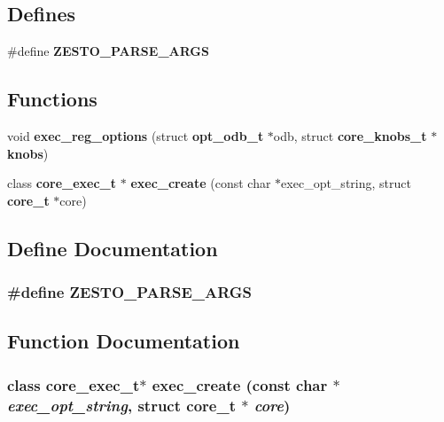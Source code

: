 \subsection*{Defines}
\begin{CompactItemize}
\item 
\#define {\bf ZESTO\_\-PARSE\_\-ARGS}
\end{CompactItemize}
\subsection*{Functions}
\begin{CompactItemize}
\item 
void {\bf exec\_\-reg\_\-options} (struct {\bf opt\_\-odb\_\-t} $\ast$odb, struct {\bf core\_\-knobs\_\-t} $\ast${\bf knobs})
\item 
class {\bf core\_\-exec\_\-t} $\ast$ {\bf exec\_\-create} (const char $\ast$exec\_\-opt\_\-string, struct {\bf core\_\-t} $\ast$core)
\end{CompactItemize}


\subsection{Define Documentation}
\subsubsection[{ZESTO\_\-PARSE\_\-ARGS}]{\setlength{\rightskip}{0pt plus 5cm}\#define ZESTO\_\-PARSE\_\-ARGS}\label{zesto-exec_8cpp_ecd9ec00b3dd5733f280e06811f8bbfc}




\subsection{Function Documentation}
\subsubsection[{exec\_\-create}]{\setlength{\rightskip}{0pt plus 5cm}class {\bf core\_\-exec\_\-t}$\ast$ exec\_\-create (const char $\ast$ {\em exec\_\-opt\_\-string}, \/  struct {\bf core\_\-t} $\ast$ {\em core})}\label{zesto-exec_8cpp_bc3339106471b5130704c973349de0ee}




